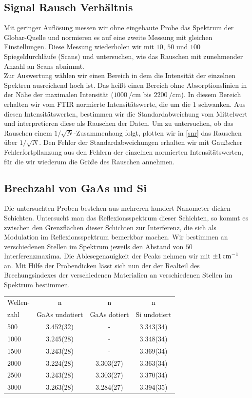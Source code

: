 \documentclass[paper=a4,fontsize=10pt,DIV=18,twocolumn,parskip=half]{scrartcl}
\numberwithin{equation}{section}    %
\begin{document}
\subsection{Signal Rausch Verhältnis}
Mit geringer Auflösung messen wir ohne eingebaute Probe das Spektrum der 
Globar-Quelle und normieren es auf eine zweite Messung mit gleichen 
Einstellungen. Diese Messung wiederholen wir mit $10$, $50$ und $100$ 
Spiegeldurchläufe (Scans) und untersuchen, wie das Rauschen mit zunehmender 
Anzahl an Scans abnimmt.\\
Zur Auswertung wählen wir einen Bereich in dem die Intensität der einzelnen 
Spektren ausreichend hoch ist. Das heißt einen Bereich ohne Absorptionslinien in 
der Nähe der maximalen Intensität ($\SI{1000}{\per\centi\meter}$ bis 
$\SI{2200}{\per\centi\meter}$). In diesem Bereich erhalten wir vom FTIR 
normierte Intensitätswerte, die um die $1$ schwanken. Aus diesen 
Intensitätswerten, bestimmen wir die Standardabweichung vom Mittelwert und 
interpretieren diese als Rauschen der Daten. Um zu untersuchen, ob das Rauschen 
einem $1/\sqrt{N}$-Zusammenhang folgt, plotten wir in \cref{snr} das Rauschen 
über $1/\sqrt{N}$. Den Fehler der Standardabweichungen erhalten wir mit 
Gaußscher Fehlerfortpflanzung aus den Fehlern der einzelnen normierten 
Intensitätswerten, für die wir wiederum die Größe des Rauschen annehmen.


\subsection{Brechzahl von GaAs und Si}
Die untersuchten Proben bestehen aus mehreren hundert Nanometer dicken 
Schichten.
Untersucht man das Reflexionsspektrum dieser Schichten, so kommt es zwischen den 
Grenzflächen dieser Schichten zur Interferenz, die sich als Modulation im 
Reflexionsspektrum bemerkbar machen.  Wir bestimmen an verschiedenen Stellen im 
Spektrum jeweils den Abstand von $50$ Interferenzmaxima. Die Ablesegenauigkeit 
der Peaks nehmen wir mit $\SI{\pm 1}{\centi\meter^{-1}}$ an.
Mit Hilfe der Probendicken lässt sich nun der der Realteil des Brechungsindexes 
der verschiedenen Materialien an verschiedenen Stellen im Spektrum bestimmen.

\begin{tabular}{ l | c c c }
  Wellen- & n & n&n\\
  zahl & GaAs undotiert & GaAs dotiert & Si undotiert \\
  \hline
  500 & 3.452(32) & - & 3.343(34) \\
  1000 & 3.245(28) & - & 3.348(34) \\
  1500 & 3.243(28) & - & 3.369(34) \\
  2000 & 3.224(28) & 3.303(27) & 3.363(34) \\
  2500 & 3.243(28) & 3.303(27) & 3.370(34) \\
  3000 & 3.263(28) & 3.284(27) & 3.394(35) \\
\end{tabular}
\end{document}
